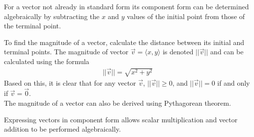 \documentclass[a4paper]{article}
\let\bf\textbf
\let\la\langle
\let\ra\rangle
\begin{document}
\noindent For a vector not already in standard form its component form can be determined algebraically by subtracting the $x$ and $y$ values of the initial point from those of the terminal point.
\begin{center}
\end{center}
\noindent To find the magnitude of a vector, calculate the distance between its initial and terminal points. The magnitude of vector $\vec{v} = \la x, y \ra$ is denoted $||\vec{v}||$ and can be calculated using the formula
\begin{align*}
    ||\vec{v}|| = \sqrt{x^2 + y^2}
\end{align*}
Based on this, it is clear that for any vector $\vec{v}$, $||\vec{v}|| \geq 0$, and $||\vec{v}|| = 0$ if and only if $\vec{v} = \vec{0}$.\vspace{1mm}\\
The magnitude of a vector can also be derived using Pythagorean theorem.
\begin{center}
\end{center}
Expressing vectors in component form allows scalar multiplication and vector addition to be performed algebraically.
\begin{center}
\end{center}
\end{document}
